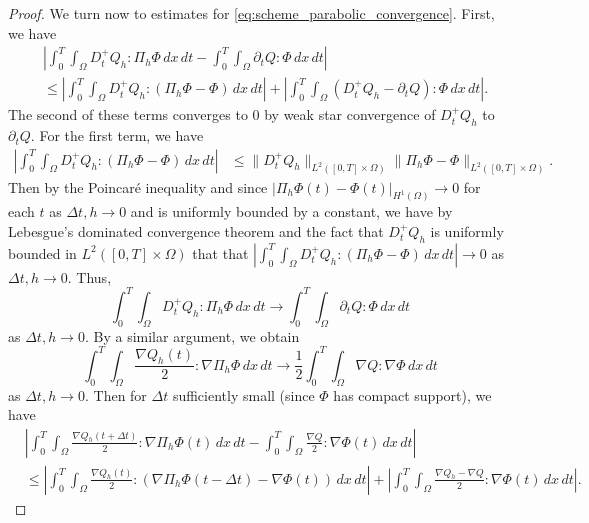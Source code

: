 \documentclass[10pt,letterpaper]{amsart}
\theoremstyle{definition}{\newtheorem{definition}[lemma]{Definition}}
\theoremstyle{note}{\newtheorem{claim}{Claim}[section]
\newtheorem*{claim*}{Claim}}
\numberwithin{equation}{section}
\begin{document}
\begin{proof}
We turn now to estimates for \eqref{eq:scheme_parabolic_convergence}. First, we have
\begin{align*}
    &\left\lvert \int_0^T \int_\Omega D_t^+ Q_h:\Pi_h\Phi\, dx\, dt - \int_0^T\int_\Omega \partial_t Q:\Phi\, dx\, dt\right\rvert\\
        &\le \left\lvert \int_0^T\int_\Omega D_t^+ Q_h: (\Pi_h\Phi - \Phi)\, dx\, dt\right\rvert + \left\lvert\int_0^T\int_\Omega (D_t^+ Q_h - \partial_t Q):\Phi\, dx\, dt\right\rvert.
\end{align*}
The second of these terms converges to $0$ by weak star convergence of $D_t^+ Q_h$ to $\partial_t Q$. For the first term, we have
\begin{align*}
    \left\lvert \int_0^T\int_\Omega D_t^+ Q_h: (\Pi_h\Phi - \Phi)\, dx\, dt\right\rvert
        &\le \|D_t^+ Q_h\|_{L^2([0,T]\times\Omega)}\|\Pi_h\Phi - \Phi\|_{L^2([0,T]\times\Omega)}.
\end{align*}
Then by the Poincar\'e inequality and since $\lvert\Pi_h\Phi(t) - \Phi(t) \rvert_{H^1(\Omega)} \to 0$ for each $t$ as $\Delta t, h\to 0$ and is uniformly bounded by a constant, we have by Lebesgue's dominated convergence theorem and the fact that $D_t^+ Q_h$ is uniformly bounded in $L^2([0,T]\times\Omega)$ that that $\left\lvert \int_0^T\int_\Omega D_t^+ Q_h: (\Pi_h\Phi - \Phi)\, dx\, dt\right\rvert \to 0$ as $\Delta t, h\to 0$. Thus,
\begin{equation}
    \int_0^T \int_\Omega D_t^+ Q_h:\Pi_h\Phi\, dx\, dt \to \int_0^T\int_\Omega \partial_t Q:\Phi\, dx\, dt
\end{equation}
as $\Delta t, h\to 0$. By a similar argument, we obtain
\begin{equation}
    \int_0^T\int_\Omega \frac{\nabla Q_h(t)}{2}:\nabla\Pi_h\Phi\, dx\, dt \to \frac{1}{2} \int_0^T\int_\Omega \nabla Q:\nabla\Phi\, dx\, dt
\end{equation}
as $\Delta t, h\to 0$. Then for $\Delta t$ sufficiently small (since $\Phi$ has compact support), we have
\begin{align*}
    &\left\lvert \int_0^T\int_\Omega \frac{\nabla Q_h(t+\Delta t)}{2}:\nabla\Pi_h\Phi(t)\, dx\, dt - \int_0^T \int_\Omega \frac{\nabla Q}{2}: \nabla\Phi(t)\, dx\, dt\right\rvert\\ 
    &\le \left\lvert \int_0^T\int_\Omega \frac{\nabla Q_h(t)}{2}:(\nabla\Pi_h\Phi(t-\Delta t) - \nabla\Phi(t))\, dx\, dt\right\rvert + \left\lvert \int_0^T \int_\Omega \frac{\nabla Q_h - \nabla Q}{2}: \nabla\Phi(t)\, dx\, dt\right\rvert.
\end{align*}

\end{proof}
\end{document}
